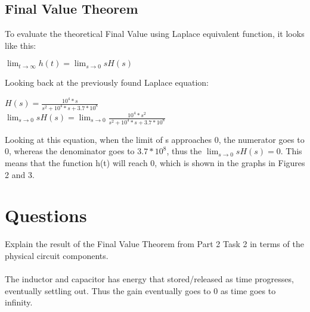 \documentclass[12pt,a4paper]{article}
\begin{document}
\subsection{Final Value Theorem}
To evaluate the theoretical Final Value using Laplace equivalent function, it looks like this:
\begin{center}
    $\lim_{t\to\infty} h(t) = \lim_{s\to 0} sH(s)$
\end{center}
Looking back at the previously found Laplace equation:\\
\begin{center}
$H(s)=\frac{10^4*s}{s^2+10^4*s+3.7*10^8}$ \\
$\lim_{s\to 0} sH(s)=\lim_{s\to 0}\frac{10^4*s^2}{s^2+10^4*s+3.7*10^8}$ 
\end{center}
Looking at this equation, when the limit of s approaches 0, the numerator goes to 0, whereas the denominator goes to $3.7*10^8$, thus the $\lim_{s\to 0} sH(s) = 0$. This means that the function h(t) will reach 0, which is shown in the graphs in Figures 2 and 3.
\section{Questions}
Explain the result of the Final Value Theorem from Part 2 Task 2 in terms of the physical
circuit components.\\
\\
The inductor and capacitor has energy that stored/released as time progresses, eventually settling out. Thus the gain eventually goes to 0 as time goes to infinity.
\end{document}
